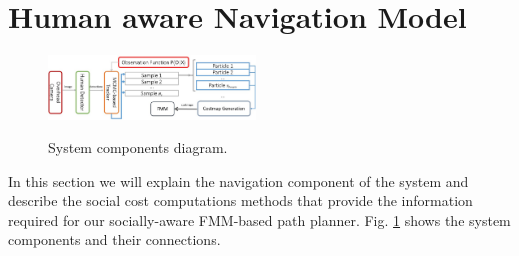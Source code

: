 \section{Human aware Navigation Model}
\label{social_nav}



\begin{figure}
\centering
{\includegraphics[width=0.49\textwidth]{pictures/block.jpg}}
\caption{System components diagram.}
\label{fig:block}
\end{figure}


In this section we will explain the navigation component of the system and describe the social cost computations methods that provide the information required for our socially-aware FMM-based path planner. Fig. \ref{fig:block} shows the system components and their connections.



